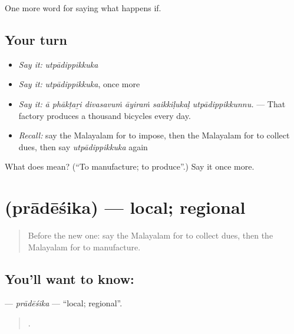 \begin{grammarlens}[title={What you've built}]
One more word for saying what happens if.
\end{grammarlens}

\subsection*{Your turn}
\begin{itemize}
\raggedright
  \item \emph{Say it:} \emph{utpādippikkuka}
  \item \emph{Say it:} \emph{utpādippikkuka}, once more
  \item \emph{Say it:} \emph{ā phākṭaṟi divasavuṁ āyiraṁ saikkiḷukaḷ utpādippikkunnu.} — That factory produces a thousand bicycles every day.
  \item \emph{Recall:} say the Malayalam for to impose, then the Malayalam for to collect dues, then say \emph{utpādippikkuka} again
\end{itemize}

\begin{tcolorbox}[breakable,colback=teal!4,colframe=teal!35!black,title={Before you move on}]
What does  mean? (\textquotedblleft{}To manufacture; to produce\textquotedblright{}.) Say it once more.
\end{tcolorbox}
\section[\texorpdfstring{\ml{പ്രാദേശിക} (prādēśika)}{പ്രാദേശിക (prādēśika)}]{ (prādēśika) — local; regional}

\label{lesson:ML-C459-pradesika}



\begin{quote}
Before the new one: say the Malayalam for to collect dues, then the Malayalam for to manufacture.
\end{quote}

\subsection*{You'll want to know: }
\textbf{} — \emph{prādēśika} — \textquotedblleft{}local; regional\textquotedblright{}.

\begin{quote}
     .
\end{quote}

